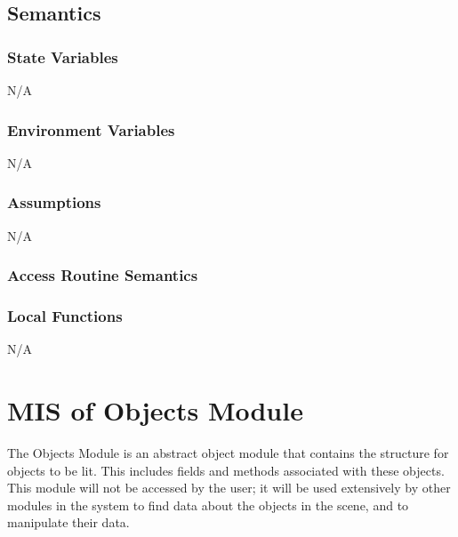 \documentclass[12pt, titlepage]{article}
\begin{document}
\subsection{Semantics}
\subsubsection{State Variables}
N/A

\subsubsection{Environment Variables}
N/A

\subsubsection{Assumptions}
N/A

\subsubsection{Access Routine Semantics}

%

\subsubsection{Local Functions}
N/A

\newpage


\section{MIS of Objects Module} \label{mObjects} 
The Objects Module is an abstract object module that contains the structure for 
objects to be lit. This includes fields and methods associated with these 
objects. This module will not be accessed by the user; it will be used 
extensively by other modules in the system to find data about the objects in 
the scene, and to manipulate their data.
%
%
\end{document}
